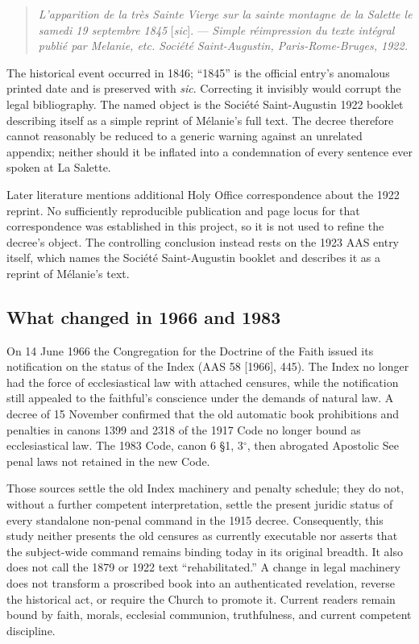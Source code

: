 \begin{quote}
\small
\emph{L'apparition de la très Sainte Vierge sur la sainte montagne de la Salette le samedi 19 septembre 1845} [\emph{sic}]. --- \emph{Simple réimpression du texte intégral publié par Melanie, etc. Société Saint-Augustin, Paris-Rome-Bruges, 1922.}
\end{quote}

The historical event occurred in 1846; ``1845'' is the official entry's anomalous printed date and is preserved with \emph{sic}. Correcting it invisibly would corrupt the legal bibliography. The named object is the Société Saint-Augustin 1922 booklet describing itself as a simple reprint of Mélanie's full text. The decree therefore cannot reasonably be reduced to a generic warning against an unrelated appendix; neither should it be inflated into a condemnation of every sentence ever spoken at La Salette.

Later literature mentions additional Holy Office correspondence about the 1922 reprint. No sufficiently reproducible publication and page locus for that correspondence was established in this project, so it is not used to refine the decree's object. The controlling conclusion instead rests on the 1923 AAS entry itself, which names the Société Saint-Augustin booklet and describes it as a reprint of Mélanie's text.

\subsection{What changed in 1966 and 1983}

On 14 June 1966 the Congregation for the Doctrine of the Faith issued its notification on the status of the Index (AAS 58 [1966], 445). The Index no longer had the force of ecclesiastical law with attached censures, while the notification still appealed to the faithful's conscience under the demands of natural law. A decree of 15 November confirmed that the old automatic book prohibitions and penalties in canons 1399 and 2318 of the 1917 Code no longer bound as ecclesiastical law. The 1983 Code, canon 6 \S1, 3$^\circ$, then abrogated Apostolic See penal laws not retained in the new Code.

Those sources settle the old Index machinery and penalty schedule; they do not, without a further competent interpretation, settle the present juridic status of every standalone non-penal command in the 1915 decree. Consequently, this study neither presents the old censures as currently executable nor asserts that the subject-wide command remains binding today in its original breadth. It also does not call the 1879 or 1922 text ``rehabilitated.'' A change in legal machinery does not transform a proscribed book into an authenticated revelation, reverse the historical act, or require the Church to promote it. Current readers remain bound by faith, morals, ecclesial communion, truthfulness, and current competent discipline.

